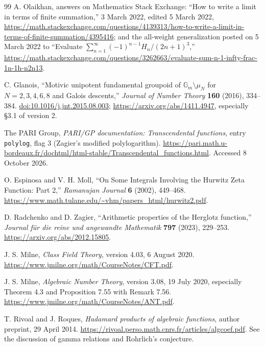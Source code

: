 \begin{thebibliography}{99}
A. Olaikhan, answers on Mathematics Stack Exchange:
“How to write a limit in terms of finite summation,”
3 March 2022, edited 5 March 2022,
\url{https://math.stackexchange.com/questions/4139313/how-to-write-a-limit-in-terms-of-finite-summation/4395416};
and the all-weight generalization posted on 5 March 2022 to
“Evaluate $\sum_{n=1}^{\infty}(-1)^{n-1}H_n/(2n+1)^3$,”
\url{https://math.stackexchange.com/questions/3262663/evaluate-sum-n-1-infty-frac-1n-1h-n2n13}.

C. Glanois, “Motivic unipotent fundamental groupoid of
$\mathbb G_m\setminus\mu_N$ for $N=2,3,4,6,8$ and Galois descents,”
\emph{Journal of Number Theory} \textbf{160} (2016), 334--384.
\href{https://doi.org/10.1016/j.jnt.2015.08.003}{doi:10.1016/j.jnt.2015.08.003};
\url{https://arxiv.org/abs/1411.4947}, especially \S3.1 of version 2.

The PARI Group, \emph{PARI/GP documentation: Transcendental functions},
entry \texttt{polylog}, flag $3$ (Zagier's modified polylogarithm).
\url{https://pari.math.u-bordeaux.fr/dochtml/html-stable/Transcendental_functions.html}.
Accessed 8 October 2026.

O. Espinosa and V. H. Moll, “On Some Integrals Involving the
Hurwitz Zeta Function: Part 2,” \emph{Ramanujan Journal}
\textbf{6} (2002), 449--468.
\url{https://www.math.tulane.edu/~vhm/papers_html/hurwitz2.pdf}.

D. Radchenko and D. Zagier, “Arithmetic properties of the Herglotz
function,” \emph{Journal f\"ur die reine und angewandte Mathematik}
\textbf{797} (2023), 229--253.
\url{https://arxiv.org/abs/2012.15805}.

J. S. Milne, \emph{Class Field Theory}, version 4.03,
6 August 2020.
\url{https://www.jmilne.org/math/CourseNotes/CFT.pdf}.

J. S. Milne, \emph{Algebraic Number Theory}, version 3.08,
19 July 2020, especially Theorem 4.3 and
Proposition 7.55 with Remark 7.56.
\url{https://www.jmilne.org/math/CourseNotes/ANT.pdf}.

T. Rivoal and J. Roques, \emph{Hadamard products of algebraic functions},
author preprint, 29 April 2014.
\url{https://rivoal.perso.math.cnrs.fr/articles/algcoef.pdf}.
See the discussion of gamma relations and Rohrlich's conjecture.

\end{thebibliography}
\endgroup

